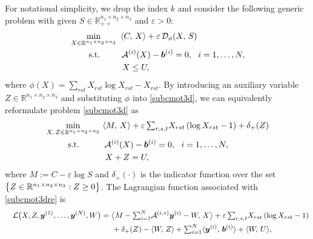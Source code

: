 \documentclass[10pt]{article}
\newcommand{\cA}{{\cal A}}
\newcommand{\inprod}[2]{\langle #1 , #2 \rangle }
\def\inprod#1#2{\langle#1,\,#2\rangle}
\begin{document}
For notational simplicity, we drop the index $k$ and consider the following generic problem with given $S\in\mathbb{R}^{n_1 \times n_2 \times n_3}_{++}$ and $\varepsilon>0$:
\begin{equation}\label{subcmot3d}
\begin{aligned}
&\min\limits_{X\in\mathbb{R}^{n_1 \times n_2 \times n_3}}\,\,\,\langle {C}, \,X\rangle + \varepsilon\,\mathcal{D}_{\phi}(X, \,S) \\
&\hspace{0.8cm} \mathrm{s.t.} \hspace{0.9cm} \cA^{(i)}(X) - \bm{b}^{(i)} = 0, ~~i = 1, \dots, N, \\
&\hspace{2.2cm} X \leq U,
\end{aligned}
\end{equation}
where $\phi(X)=\sum_{rst}X_{rst}\log X_{rst}-X_{rst}$. By introducing an auxiliary variable $Z\in\mathbb{R}^{n_1 \times n_2 \times n_3}$ and substituting $\phi$ into \eqref{subcmot3d}, we can equivalently reformulate problem \eqref{subcmot3d} as
\begin{equation}\label{subcmot3dre}
\begin{aligned}
&\min\limits_{X, \,Z\in\mathbb{R}^{n_1 \times n_2 \times n_3}}~\langle M, \,X\rangle + \varepsilon\,{\textstyle\sum_{r,s,t}} X_{rst}\left(\log X_{rst} - 1\right) + \delta_+(Z) \\
&\hspace{0.95cm} \mathrm{s.t.} \hspace{1.05cm} \cA^{(i)}(X) - \bm{b}^{(i)} = 0, ~~i = 1, \dots, N, \\
&\hspace{2.5cm} X + Z = U,
\end{aligned}
\end{equation}
where $M := C - \varepsilon\log S$ and $\delta_{+}(\cdot)$ is the indicator function over the set $\big{\{}Z\in\mathbb{R}^{n_1 \times n_2 \times n_3}: Z\geq0\big{\}}$. The Lagrangian function associated with \eqref{subcmot3dre} is
\begin{equation*}%
\begin{aligned}
\quad \mathcal{L}\big{(}X, Z, \bm{y}^{(1)},\dots, \bm{y}^{(N)},W \big{)}
&=\big\langle M-{\textstyle\sum_{i=1}^N}\cA^{(i,*)}\bm{y}^{(i)} -W, \,X \big\rangle + \varepsilon\,{\textstyle\sum_{r,s,t}} X_{rst}\left(\log X_{rst} - 1\right)\\
&\hspace{0.5cm}
+ \delta_+(Z) - \inprod{W}{Z} + {\textstyle\sum_{i=1}^N}\inprod{\bm{y}^{(i)}}{\bm{b}^{(i)}} + \inprod{W}{U} ,
\end{aligned}
\end{equation*}
\end{document}
